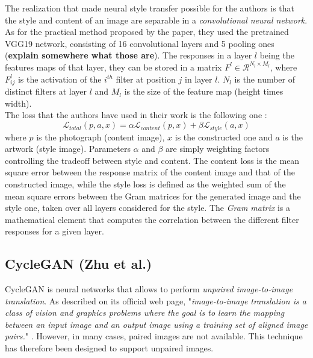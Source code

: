 \documentclass[twocolumn,superscriptaddress,aps]{revtex4-1}
\begin{document}
    The realization that made neural style transfer possible for the authors is that the style and content of an image are separable in a \emph{convolutional neural network}.\\
    
    As for the practical method proposed by the paper, they used the pretrained VGG19 network, consisting of 16 convolutional layers and 5 pooling ones (\textbf{explain somewhere what those are}). The responses in a layer $l$ being the features maps of that layer, they can be stored in a matrix $F^l \in \mathcal{R}^{N_l\times M_l}$, where $F_{ij}^l$ is the activation of the $i^{th}$ filter at position $j$ in layer $l$. $N_l$ is the number of distinct filters at layer $l$ and $M_l$ is the size of the feature map (height times width).\\ 
    
    The loss that the authors have used in their work is the following one :
    \begin{equation}
        \mathcal{L}_{total}(p,a,x) = \alpha \mathcal{L}_{content}(p,x) + \beta \mathcal{L}_{style}(a,x)
    \end{equation}
    where $p$ is the photograph (content image), $x$ is the constructed one and $a$ is the artwork (style image). Parameters $\alpha$ and $\beta$ are simply weighting factors controlling the tradeoff between style and content. The content loss is the mean square error between the response matrix of the content image and that of the constructed image, while the style loss is defined as the weighted sum of the mean square errors between the Gram matrices for the generated image and the style one, taken over all layers considered for the style. The \emph{Gram matrix} is a mathematical element that computes the correlation between the different filter responses for a given layer.
    
    \subsection{CycleGAN (Zhu et al.)}\label{methods.zhu}
    
    CycleGAN is neural networks that allows to perform \emph{unpaired image-to-image translation}. As described on its official web page, "\emph{image-to-image translation is a class of vision and graphics problems where the goal is to learn the mapping between an input image and an output image using a training set of aligned image pairs.}" \cite{junyanz.github.io}. However, in many cases, paired images are not available. This technique has therefore been designed to support unpaired images.\\
    
\end{document}
